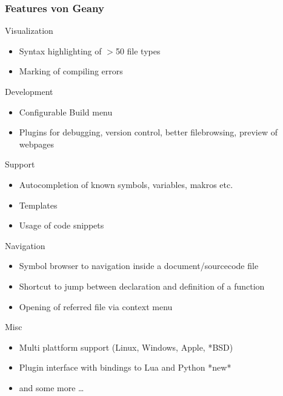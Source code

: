 \documentclass[compress]{beamer}
\begin{document}
	\begin{frame}[allowframebreaks]
		\frametitle{Features von Geany}
		
		\begin{block}{Visualization}
			\begin{itemize}
				\item Syntax highlighting of $>$50 file types
				\item Marking of compiling errors
			\end{itemize}
		\end{block}
		
		\begin{block}{Development}
			\begin{itemize}
				\item Configurable Build menu
				\item Plugins for debugging, version control, 
					better filebrowsing, preview of webpages
			\end{itemize}
		\end{block}
		
		\begin{block}{Support}
			\begin{itemize}
				\item Autocompletion of known symbols, variables, makros etc.
				\item Templates
				\item Usage of code snippets
			\end{itemize}
		\end{block}
		
		\begin{block}{Navigation}
			\begin{itemize}
				\item Symbol browser to navigation inside a document/sourcecode file
				\item Shortcut to jump between declaration and definition of a function
				\item Opening of referred file via context menu
			\end{itemize}
		\end{block}
		
		\begin{block}{Misc}
			\begin{itemize}
				\item Multi plattform support (Linux, Windows, Apple, *BSD)
				\item Plugin interface with bindings to Lua and Python *new*
				\item and some more \dots
			\end{itemize}
		\end{block}
	\end{frame}
\end{document}
